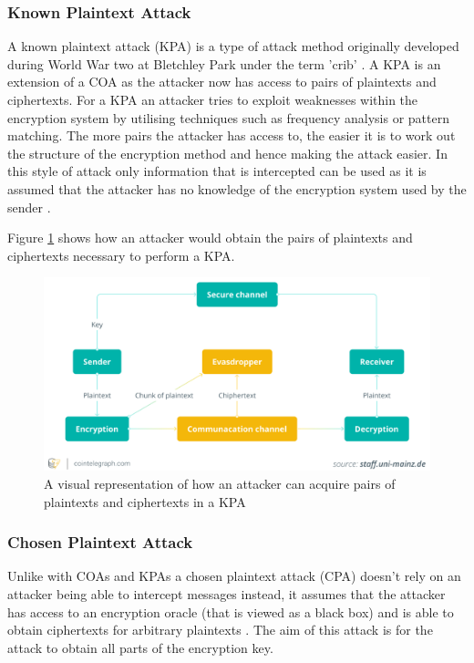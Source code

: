 \documentclass[10pt,journal,compsoc]{IEEEtran}
\begin{document}
\subsubsection{Known Plaintext Attack}
A known plaintext attack (KPA) is a type of attack method originally developed during World War two at Bletchley Park under the term 'crib' \cite{bpdict}. A KPA is an extension of a COA as the attacker now has access to pairs of plaintexts and ciphertexts. For a KPA an attacker tries to exploit weaknesses within the encryption system by utilising techniques such as frequency analysis or pattern matching. The more pairs the attacker has access to, the easier it is to work out the structure of the encryption method and hence making the attack easier. In this style of attack only information that is intercepted can be used as it is assumed that the attacker has no knowledge of the encryption system used by the sender \cite{Katz2007-mm}.

Figure \ref{fig:KPA} shows how an attacker would obtain the pairs of plaintexts and ciphertexts necessary to perform a KPA.

\begin{figure}[hbt!]
    \centering
    \includegraphics[width=0.8\linewidth, keepaspectratio]{Figures/KPA.png}
    \caption{A visual representation of how an attacker can acquire pairs of plaintexts and ciphertexts in a KPA \cite{cointelegraphCointelegraphBitcoin}}
    \label{fig:KPA}
\end{figure}

\subsubsection{Chosen Plaintext Attack}
Unlike with COAs and KPAs a chosen plaintext attack (CPA) doesn't rely on an attacker being able to intercept messages instead, it assumes that the attacker has access to an encryption oracle (that is viewed as a black box) and is able to obtain ciphertexts for arbitrary plaintexts \cite{Katz2007-mm}. The aim of this attack is for the attack to obtain all parts of the encryption key. 
\end{document}
